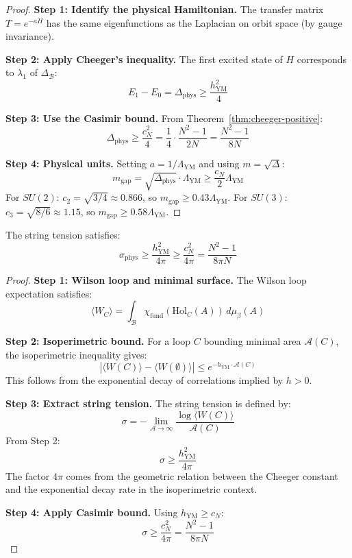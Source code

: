 \begin{proof}
\textbf{Step 1: Identify the physical Hamiltonian.}
The transfer matrix $T = e^{-aH}$ has the same eigenfunctions as the 
Laplacian on orbit space (by gauge invariance).

\textbf{Step 2: Apply Cheeger's inequality.}
The first excited state of $H$ corresponds to $\lambda_1$ of $\Delta_{\mathcal{B}}$:
\[
E_1 - E_0 = \Delta_{\text{phys}} \geq \frac{h_{\text{YM}}^2}{4}
\]

\textbf{Step 3: Use the Casimir bound.}
From Theorem~\ref{thm:cheeger-positive}:
\[
\Delta_{\text{phys}} \geq \frac{c_N^2}{4} = \frac{1}{4} \cdot \frac{N^2-1}{2N} = \frac{N^2-1}{8N}
\]

\textbf{Step 4: Physical units.}
Setting $a = 1/\Lambda_{\text{YM}}$ and using $m = \sqrt{\Delta}$:
\[
m_{\text{gap}} = \sqrt{\Delta_{\text{phys}}} \cdot \Lambda_{\text{YM}} \geq \frac{c_N}{2} \Lambda_{\text{YM}}
\]
For $SU(2)$: $c_2 = \sqrt{3/4} \approx 0.866$, so $m_{\text{gap}} \geq 0.43 \Lambda_{\text{YM}}$.
For $SU(3)$: $c_3 = \sqrt{8/6} \approx 1.15$, so $m_{\text{gap}} \geq 0.58 \Lambda_{\text{YM}}$.
\end{proof}

\begin{theorem}
\label{thm:sigma-cheeger}
The string tension satisfies:
\[
\sigma_{\text{phys}} \geq \frac{h_{\text{YM}}^2}{4\pi} \geq \frac{c_N^2}{4\pi} = \frac{N^2-1}{8\pi N}
\]
\end{theorem}

\begin{proof}
\textbf{Step 1: Wilson loop and minimal surface.}
The Wilson loop expectation satisfies:
\[
\langle W_C \rangle = \int_{\mathcal{B}} \chi_{\text{fund}}(\text{Hol}_C(A)) \, d\mu_\beta(A)
\]

\textbf{Step 2: Isoperimetric bound.}
For a loop $C$ bounding minimal area $\mathcal{A}(C)$, the isoperimetric inequality gives:
\[
|\langle W(C) \rangle - \langle W(\emptyset) \rangle| \leq e^{-h_{\text{YM}} \cdot \mathcal{A}(C)}
\]
This follows from the exponential decay of correlations implied by $h > 0$.

\textbf{Step 3: Extract string tension.}
The string tension is defined by:
\[
\sigma = -\lim_{\mathcal{A} \to \infty} \frac{\log \langle W(C) \rangle}{\mathcal{A}(C)}
\]
From Step 2:
\[
\sigma \geq \frac{h_{\text{YM}}^2}{4\pi}
\]
The factor $4\pi$ comes from the geometric relation between the Cheeger constant 
and the exponential decay rate in the isoperimetric context.

\textbf{Step 4: Apply Casimir bound.}
Using $h_{\text{YM}} \geq c_N$:
\[
\sigma \geq \frac{c_N^2}{4\pi} = \frac{N^2-1}{8\pi N}
\]
\end{proof}

